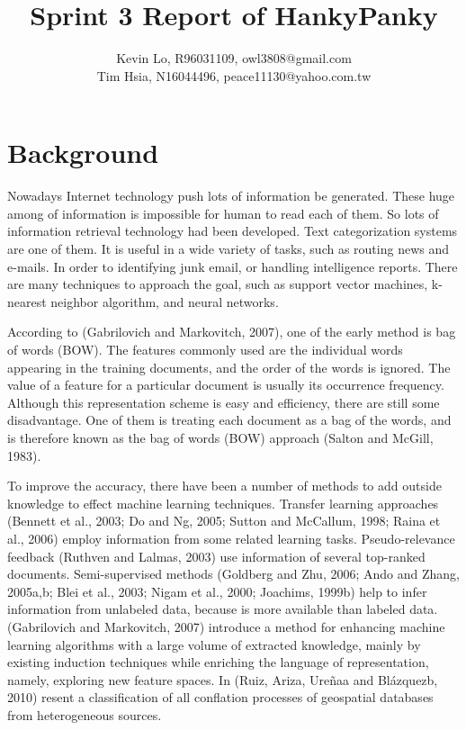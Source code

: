 \documentclass[a4paper,twocolumn]{article} %
\begin{document}

\title{Sprint 3 Report of HankyPanky}
\author{Kevin Lo, R96031109, owl3808@gmail.com \\ Tim Hsia, N16044496, peace11130@yahoo.com.tw}

\maketitle                     %





\section*{Background}
\label{sec:prob}

Nowadays Internet technology push lots of information be generated. These huge among of information is impossible for human to read each of them. So lots of information retrieval technology had been developed. Text categorization systems are one of them. It is useful in a wide variety of tasks, such as routing news and e-mails. In order to identifying junk email, or handling intelligence reports. There are many techniques to approach the goal, such as support vector machines, k-nearest neighbor algorithm, and neural networks.
  
According to (Gabrilovich and  Markovitch, 2007), one of the early method is bag of words (BOW). The features commonly used are the individual words appearing in the training documents, and the order of the words is ignored. The value of a feature for a particular document is usually its occurrence frequency. Although this representation scheme is easy and efficiency,  there are still some disadvantage. One of them is treating each document as a bag of the words, and is therefore known as the bag of words (BOW) approach (Salton and McGill, 1983).
  
To improve the accuracy, there have been a number of methods to add outside knowledge to effect machine learning techniques. Transfer learning approaches (Bennett et al., 2003; Do and Ng, 2005; Sutton and McCallum, 1998; Raina et al., 2006) employ information from some related learning tasks. Pseudo-relevance feedback (Ruthven and Lalmas, 2003) use information of several top-ranked documents. Semi-supervised methods (Goldberg and Zhu, 2006; Ando and Zhang, 2005a,b; Blei et al., 2003; Nigam et al., 2000; Joachims, 1999b) help to infer information from unlabeled data, because is more available than labeled data. (Gabrilovich and  Markovitch, 2007) introduce a method for enhancing machine learning algorithms with a large volume of extracted knowledge, mainly by existing induction techniques while enriching the language of representation, namely, exploring new feature spaces. In (Ruiz, Ariza, Ureñaa and Blázquezb, 2010) resent a classification of all conflation processes of geospatial databases from heterogeneous sources.
\end{document}
